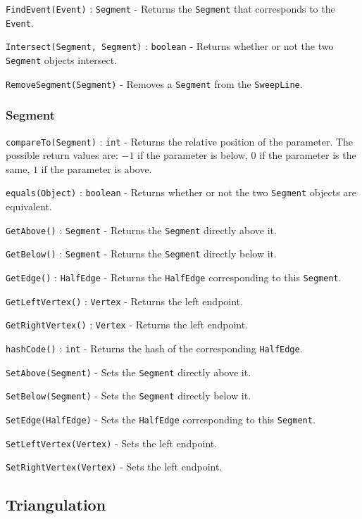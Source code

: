 \documentclass[11pt]{article}
\begin{document}
\texttt{FindEvent(Event)} : \texttt{Segment} - Returns the \texttt{Segment} that corresponds to the \texttt{Event}.

\texttt{Intersect(Segment, Segment)} : \texttt{boolean} - Returns whether or not the two \texttt{Segment} objects intersect.

\texttt{RemoveSegment(Segment)} - Removes a \texttt{Segment} from the \texttt{SweepLine}.

\subsubsection{Segment}
\label{sec:segment}

\texttt{compareTo(Segment)} : \texttt{int} - Returns the relative position of the parameter. The possible return values are: $-1$ if the parameter is below, $0$ if the parameter is the same, $1$ if the parameter is above.

\texttt{equals(Object)} : \texttt{boolean} - Returns whether or not the two \texttt{Segment} objects are equivalent.

\texttt{GetAbove()} : \texttt{Segment} - Returns the \texttt{Segment} directly above it.

\texttt{GetBelow()} : \texttt{Segment} - Returns the \texttt{Segment} directly below it.

\texttt{GetEdge()} : \texttt{HalfEdge} - Returns the \texttt{HalfEdge} corresponding to this \texttt{Segment}.

\texttt{GetLeftVertex()} : \texttt{Vertex} - Returns the left endpoint.

\texttt{GetRightVertex()} : \texttt{Vertex} - Returns the left endpoint.

\texttt{hashCode()} : \texttt{int} - Returns the hash of the corresponding \texttt{HalfEdge}.

\texttt{SetAbove(Segment)} - Sets the \texttt{Segment} directly above it.

\texttt{SetBelow(Segment)} - Sets the \texttt{Segment} directly below it.

\texttt{SetEdge(HalfEdge)} - Sets the \texttt{HalfEdge} corresponding to this \texttt{Segment}.

\texttt{SetLeftVertex(Vertex)} - Sets the left endpoint.

\texttt{SetRightVertex(Vertex)} - Sets the left endpoint.

\subsection{Triangulation}
\label{sec:triangulation}
\end{document}
